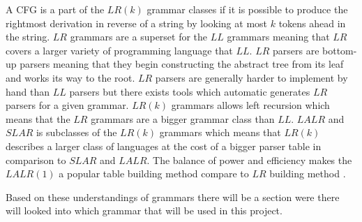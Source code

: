 A CFG is a part of the $LR(k)$ grammar classes if it is possible to produce the rightmost derivation in reverse of a string by looking at most $k$ tokens ahead in the string. $LR$ grammars are a superset for the $LL$ grammars meaning that $LR$ covers a larger variety of programming language that $LL$. $LR$ parsers are bottom-up parsers meaning that they begin constructing the abstract tree from its leaf and works its way to the root. $LR$ parsers are generally harder to implement by hand than $LL$ parsers but there exists tools which automatic generates $LR$ parsers for a given grammar. $LR(k)$ grammars allows left recursion which means that the $LR$ grammars are a bigger grammar class than $LL$. $LALR$ and $SLAR$ is subclasses of the $LR(k)$ grammars which means that $LR(k)$ describes a larger class of languages at the cost of a bigger parser table in comparison to $SLAR$ and $LALR$. The balance of power and efficiency makes the $LALR(1)$ a popular table building method compare to $LR$ building method \citep{CraftingACompiler} \citep{sebesta}.

Based on these understandings of grammars there will be a section were there will looked into which grammar that will be used in this project.